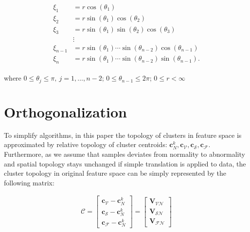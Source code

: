 \begin{align}
\begin{aligned}
\label{eq:sph2cart}
\xi_1 &= r \cos(\theta_1) \\
\xi_2 &= r \sin(\theta_1) \cos(\theta_2) \\
\xi_3 &= r \sin(\theta_1) \sin(\theta_2) \cos(\theta_3) \\
    &\vdots\\
\xi_{n-1} &= r \sin(\theta_1) \cdots \sin(\theta_{n-2}) \cos(\theta_{n-1}) \\
\xi_n &= r \sin(\theta_1) \cdots \sin(\theta_{n-2}) \sin(\theta_{n-1}) 
 .
\end{aligned}
\end{align}


where $0\leq \theta_j\leq\pi,~j=1,\dots ,n-2$; $0\leq \theta_{n-1}\leq 2 \pi$; $0\leq r<\infty$
 
 
\section{Orthogonalization}

To simplify algorithms, in this paper the topology of clusters in feature space is approximated by relative topology of cluster centroids: $\mathbf{c}_N^k, \mathbf{c}_{\mathcal{V}}, \mathbf{c}_{\mathcal{S}}, \mathbf{c}_{\mathcal{F}}$. Furthermore, as we assume that samples deviates from normality to abnormality and spatial topology stays unchanged if simple translation is applied to data, the cluster topology in original feature space can be simply represented by the following matrix:

\begin{align}
\mathcal{C} = 
\begin{bmatrix}
\mathbf{c}_{\mathcal{V}} - \mathbf{c}_N^k \\
\mathbf{c}_{\mathcal{S}} - \mathbf{c}_N^k \\
\mathbf{c}_{\mathcal{F}} - \mathbf{c}_N^k
\end{bmatrix} = 
\begin{bmatrix}
\mathbf{V}_{\mathcal{VN}} \\
\mathbf{V}_{\mathcal{SN}} \\
\mathbf{V}_{\mathcal{FN}}
\end{bmatrix}
\end{align}

